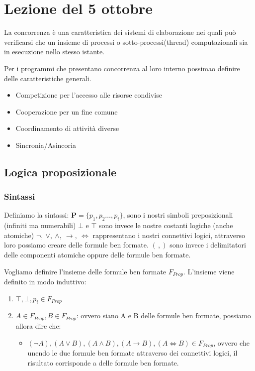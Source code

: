 \section{Lezione del 5 ottobre}

La concorrenza è una caratteristica dei sistemi di elaborazione nei quali può verificarsi
che un insieme di processi o sotto-processi(thread) computazionali sia in esecuzione nello
stesso istante. 

Per i programmi che presentano concorrenza al loro interno possimao definire delle caratteristiche generali.
\begin{itemize}
    \item Competizione per l'accesso alle risorse condivise
    \item Cooperazione per un fine comune
    \item Coordinamento di attività diverse
    \item Sincronia/Asincoria 
\end{itemize}

\subsection{Logica proposizionale}
\subsubsection{Sintassi}
Definiamo la sintassi: \hfill \newline
$\mathbf{P} = \{p_1,p_2 \dots, p_i\}$, sono i nostri simboli preposizionali (infiniti ma numerabili) \hfill \newline
$\bot$ e $\top$ sono invece le nostre costanti logiche (anche atomiche) \hfill \newline
$\neg, \ \lor, \ \land , \ \to, \ \Leftrightarrow$ rappresentano i nostri connettivi logici, attraverso loro possiamo creare delle formule ben formate. \hfill \newline
$( \,,) $ sono invece i delimitatori delle componenti atomiche oppure delle formule ben formate.
\bigskip

Vogliamo definire l'insieme delle formule ben formate $F_{Prop}$. L'insieme viene definito in modo induttivo:
\begin{enumerate}
    \item $\top, \bot, p_i \in F_{Prop}$
    \item $A \in F_{Prop},  B \in F_{Prop}$: ovvero siano A e B delle formule ben formate, possiamo allora dire che:
    \begin{itemize}
        \item $(\neg A), (A \lor B), (A \land B), (A \to B), (A \Leftrightarrow B) \in F_{Prop}$, ovvero che unendo le due formule ben formate attraverso dei connettivi logici, il risultato corrisponde a delle formule ben formate. 
    \end{itemize}
\end{enumerate}

